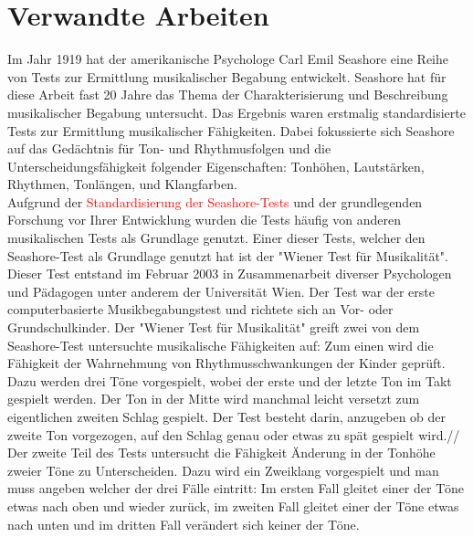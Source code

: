 \documentclass{acm_proc_article-sp}
\begin{document}
\section{Verwandte Arbeiten}
Im Jahr 1919 hat der amerikanische Psychologe Carl Emil Seashore eine Reihe von Tests zur Ermittlung musikalischer Begabung entwickelt\cite{gordon:2000}. Seashore hat für diese Arbeit fast 20 Jahre das Thema der Charakterisierung und Beschreibung musikalischer Begabung untersucht. Das Ergebnis waren erstmalig standardisierte Tests zur Ermittlung musikalischer Fähigkeiten. Dabei fokussierte sich Seashore auf das Gedächtnis für Ton- und Rhythmusfolgen und die Unterscheidungsfähigkeit folgender Eigenschaften: Tonhöhen, Lautstärken, Rhythmen, Tonlängen, und Klangfarben.\\
Aufgrund der \textcolor{red}{Standardisierung der Seashore-Tests} und der grundlegenden Forschung vor Ihrer Entwicklung wurden die Tests häufig von anderen musikalischen Tests als Grundlage genutzt. 
Einer dieser Tests, welcher den Seashore-Test als Grundlage genutzt hat ist der "Wiener Test für Musikalität"\cite{laengle:2003}. Dieser Test entstand im Februar 2003 in Zusammenarbeit diverser Psychologen und Pädagogen unter anderem der Universität Wien. Der Test war der erste computerbasierte Musikbegabungstest und richtete sich an Vor- oder Grundschulkinder. Der "Wiener Test für Musikalität" greift zwei von dem Seashore-Test untersuchte musikalische Fähigkeiten auf: Zum einen wird die Fähigkeit der Wahrnehmung von Rhythmusschwankungen der Kinder geprüft. Dazu werden drei Töne vorgespielt, wobei der erste und der letzte Ton im Takt gespielt werden. Der Ton in der Mitte wird manchmal leicht versetzt zum eigentlichen zweiten Schlag gespielt. Der Test besteht darin, anzugeben ob der zweite Ton vorgezogen, auf den Schlag genau oder etwas zu spät gespielt wird.//
Der zweite Teil des Tests untersucht die Fähigkeit Änderung in der Tonhöhe zweier Töne zu Unterscheiden. Dazu wird ein Zweiklang vorgespielt und man muss angeben welcher der drei Fälle eintritt: Im ersten Fall gleitet einer der Töne etwas nach oben und wieder zurück, im zweiten Fall gleitet einer der Töne etwas nach unten und im dritten Fall verändert sich keiner der Töne.
\end{document}
